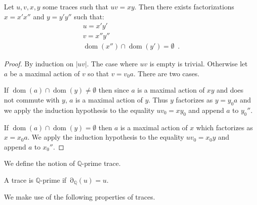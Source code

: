 \documentclass[a4paper,UKenglish]{lipics-v2016}
\newcommand{\QQ}{\mathbb{Q}}
\DeclareMathOperator{\dom}{dom}
\DeclareMathOperator{\view}{\partial}
\begin{document}
\begin{lemma}\label{lem:facto}
Let $u,v,x,y$ some traces such that
$uv=xy$.
Then there exists factorizations
$x=x'x''$ and $y=y'y''$ such that:
\begin{align}
&u=x'y'\\
&v=x''y''\\
&\dom(x'') \cap \dom(y')=\emptyset\enspace.
\end{align}
\end{lemma}
\begin{proof}
By induction on $|uv|$.
The case where $uv$ is empty is trivial.
Otherwise let $a$ be a maximal action of $v$ so that
$v=v_0a$. There are two cases.

If $\dom(a) \cap \dom(y)\neq\emptyset$
then since $a$ is a maximal action of $xy$
and does not commute with $y$,
$a$ is a maximal action of $y$.
Thus $y$ factorizes as $y=y_0a$
and we apply the induction hypothesis to the equality
$uv_0=xy_0$ and append $a$ to $y_0''$.

If $\dom(a) \cap \dom(y)=\emptyset$
then $a$ is a maximal action of $x$ which factorizes as $x=x_0a$. We apply the induction hypothesis
to the equality $uv_0=x_0y$ and append $a$ to $x_0''$.
\end{proof}

We define the notion of $\QQ$-prime trace.
\begin{definition}[$\QQ$-prime trace]
A trace is $\QQ$-prime if $\view_\QQ(u)=u$.
\end{definition}

We make use of the following properties of traces.
\end{document}
